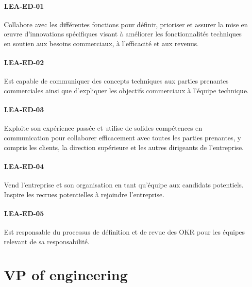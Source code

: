 \documentclass[a4paper, french, openany, 12pt]{book}
\newcommand\cha[1]{\textcolor{OliveGreen}{\textbf{\uppercase{lea-{#1}}}}}
\begin{document}
\begin{multicols}{2}
  \subsubsection*{\cha{ed-01}}

  Collabore avec les différentes fonctions pour définir, prioriser et assurer la mise en œuvre d'innovations spécifiques 
  visant à améliorer les fonctionnalités techniques en soutien aux besoins commerciaux, à l'efficacité et aux revenus.

  \subsubsection*{\cha{ed-02}}

  Est capable de communiquer des concepts techniques aux parties prenantes commerciales ainsi que d'expliquer les 
  objectifs commerciaux à l'équipe technique.

  \subsubsection*{\cha{ed-03}}

  Exploite son expérience passée et utilise de solides compétences en communication pour collaborer efficacement avec 
  toutes les parties prenantes, y compris les clients, la direction supérieure et les autres dirigeants de l'entreprise.

  \subsubsection*{\cha{ed-04}}

  Vend l'entreprise et son organisation en tant qu'équipe aux candidats potentiels. 
  Inspire les recrues potentielles à rejoindre l'entreprise.

  \subsubsection*{\cha{ed-05}}

  Est responsable du processus de définition et de revue des OKR pour les équipes relevant de sa responsabilité.

\end{multicols}

\chapter{VP of engineering}
\end{document}
